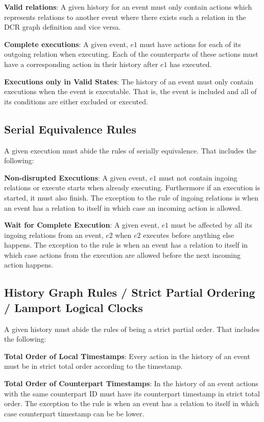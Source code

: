 	\newpar \textbf{Valid relations}: A given history for an event must only contain actions which represents relations to another event where there exists such a relation in the DCR graph definition and vice versa. 
	
	\newpar \textbf{Complete executions}: A given event, $e1$ must have actions for each of its outgoing relation when executing. Each of the counterparts of these actions must have a corresponding action in their history after $e1$ has executed.
	
	\newpar \textbf{Executions only in Valid States}: The history of an event must only contain executions when the event is executable. That is, the event is included and all of its conditions are either excluded or executed.
	
	\subsection{Serial Equivalence Rules}
	A given execution must abide the rules of serially equivalence. That includes the following:
	
	\newpar \textbf{Non-disrupted Executions}: A given event, $e1$ must not contain ingoing relations or execute starts when already executing. Furthermore if an execution is started, it must also finish. The exception to the rule of ingoing relations is when an event has a relation to itself in which case an incoming action is allowed.
	
	\newpar \textbf{Wait for Complete Execution}: A given event, $e1$ must be affected by all its ingoing relations from an event, $e2$ when $e2$ executes before anything else happens. The exception to the rule is when an event has a relation to itself in which case actions from the execution are allowed before the next incoming action happens. 
	
	\subsection{History Graph Rules / Strict Partial Ordering / Lamport Logical Clocks}
	A given history must abide the rules of being a strict partial order. That includes the following:
	
	\newpar \textbf{Total Order of Local Timestamps}: Every action in the history of an event must be in strict total order according to the timestamp.
	
	\newpar \textbf{Total Order of Counterpart Timestamps}: In the history of an event actions with the same counterpart ID must have its counterpart timestamp in strict total order.  The exception to the rule is when an event has a relation to itself in which case counterpart timestamp can be be lower. 
	
